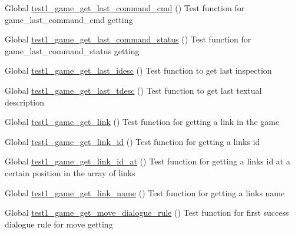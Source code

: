 \begin{DoxyRefList}
\item[Global \mbox{\hyperlink{game__test_8c_adeddd681f073ba8761a0d452d49b99e6}{test1\+\_\+game\+\_\+get\+\_\+last\+\_\+command\+\_\+cmd}} ()]\label{test__test000269}%
%
Test function for game\+\_\+last\+\_\+command\+\_\+cmd getting  
\item[Global \mbox{\hyperlink{game__test_8c_a6ddc73405a97b66ed5c8ab4af2a3f2f1}{test1\+\_\+game\+\_\+get\+\_\+last\+\_\+command\+\_\+status}} ()]\label{test__test000272}%
%
Test function for game\+\_\+last\+\_\+command\+\_\+status getting  
\item[Global \mbox{\hyperlink{game__test_8c_af111363055eac20a270bfd7edd7bd888}{test1\+\_\+game\+\_\+get\+\_\+last\+\_\+idesc}} ()]\label{test__test000282}%
%
Test function to get last inspection  
\item[Global \mbox{\hyperlink{game__test_8c_a81feaafdd3aad85d68b0397c104fb01b}{test1\+\_\+game\+\_\+get\+\_\+last\+\_\+tdesc}} ()]\label{test__test000278}%
%
Test function to get last textual description  
\item[Global \mbox{\hyperlink{game__test_8c_ae0841f160573a442bf3eaae6f38efbb0}{test1\+\_\+game\+\_\+get\+\_\+link}} ()]\label{test__test000230}%
%
Test function for getting a link in the game  
\item[Global \mbox{\hyperlink{game__test_8c_a4a2233ea21cf709a2f140a33a3d2e8a5}{test1\+\_\+game\+\_\+get\+\_\+link\+\_\+id}} ()]\label{test__test000233}%
%
Test function for getting a link\textquotesingle{}s id  
\item[Global \mbox{\hyperlink{game__test_8c_a6a35308e20596031da9350dc761f86c7}{test1\+\_\+game\+\_\+get\+\_\+link\+\_\+id\+\_\+at}} ()]\label{test__test000236}%
%
Test function for getting a link\textquotesingle{}s id at a certain position in the array of links  
\item[Global \mbox{\hyperlink{game__test_8c_a67ce824c74cd4244128a17fa99d73f68}{test1\+\_\+game\+\_\+get\+\_\+link\+\_\+name}} ()]\label{test__test000239}%
%
Test function for getting a link\textquotesingle{}s name\textquotesingle{}  
\item[Global \mbox{\hyperlink{game__test_8c_af72796b212868e71200a0b4d846d619a}{test1\+\_\+game\+\_\+get\+\_\+move\+\_\+dialogue\+\_\+rule}} ()]\label{test__test000324}%
%
Test function for first success dialogue rule for move getting  

\end{DoxyRefList}
